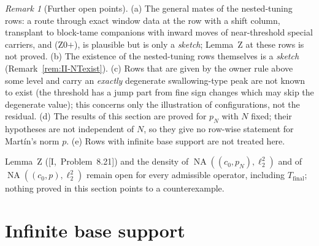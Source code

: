\documentclass[10pt]{amsart}
\theoremstyle{definition}
\theoremstyle{remark}
\newtheorem{remark}[theorem]{Remark}
\newcommand{\NA}{\operatorname{NA}}
\begin{document}
\begin{remark}[Further open points]\label{rem:II-openmisc}
(a) The general mates of the nested-tuning rows: a route through exact window data at
the row with a shift column, transplant to block-tame companions with inward moves
of near-threshold special carriers, and (Z0$+$), is plausible but is only a
\emph{sketch}; Lemma~Z at these rows is not proved.
(b) The existence of the nested-tuning rows themselves is a \emph{sketch}
(Remark~\ref{rem:II-NTexist}).
(c) Rows that are given by the owner rule above some level and carry an
\emph{exactly} degenerate swallowing-type peak are not known to exist (the threshold has
a jump part from fine sign changes which may skip the degenerate value); this concerns
only the illustration of configurations, not the residual.
(d) The results of this section are proved for $p_N$ with $N$ fixed; their hypotheses
are not independent of $N$, so they give no row-wise statement for Mart\'in's norm $p$.
(e) Rows with infinite base support are not treated here.
\end{remark}

Lemma~Z ([I,~Problem~8.21]) and the density of $\NA((c_0,p_N),\ell_2^2)$ and of
$\NA((c_0,p),\ell_2^2)$ remain open for every admissible operator, including
$T_{\mathrm{final}}$; nothing proved in this section points to a counterexample.


\section{Infinite base support}\label{sec:II-infinite}
\end{document}
